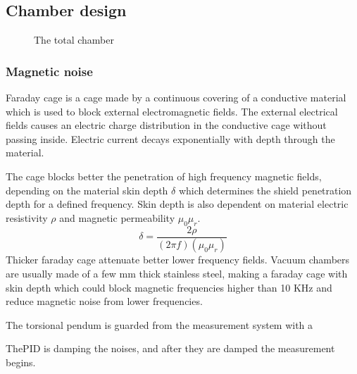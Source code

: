 \documentclass[\main/master.tex]{subfiles}
\begin{document}
\subsection{Chamber design}
\begin{figure}[htbp]
	\centering
	\caption[total chamber]{The total chamber}
	\label{fig:total}
\end{figure}
\FloatBarrier



\subsubsection{Magnetic noise}

Faraday cage is a cage made by a continuous covering of a conductive material which is used to block external electromagnetic fields. The external electrical fields causes an electric charge distribution in the conductive cage without passing inside. Electric current decays exponentially with depth through the material.

\par\noindent
The cage blocks better the penetration of high frequency magnetic fields, depending on the material skin depth $\delta$ which determines the shield penetration depth for a defined frequency. Skin depth is also dependent on material electric resistivity $\rho$ and magnetic permeability $\mu_0\mu_r$. 
\begin{equation}
\delta = \frac{2\rho}{(2\pi f)(\mu_0\mu_r)}     \label{eqn:mean-free-pass}
\end{equation}
Thicker faraday cage attenuate better lower frequency fields. Vacuum chambers are usually made of a few mm thick stainless steel, making a faraday cage with skin depth which could block magnetic frequencies higher than 10 KHz and reduce magnetic noise from lower frequencies.
\par\noindent
The torsional pendum is guarded from the measurement system with a 

















\par\noindent
ThePID is damping the noises, and after they are damped the measurement begins.
\end{document}
